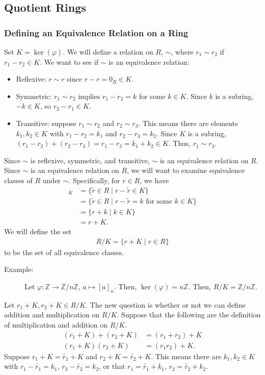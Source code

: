 \documentclass[10pt]{extarticle}
\newcommand{\Z}{\mathbb{Z}}
\begin{document}
  \subsection{Quotient Rings}%
  \subsubsection{Defining an Equivalence Relation on a Ring}%
  Set $K = \ker(\varphi)$. We will define a relation on $R$, $\sim$, where $r_1 \sim r_2$ if $r_1-r_2\in K$. We want to see if $\sim$ is an equivalence relation:
  \begin{itemize}
    \item Reflexive: $r\sim r$ since $r-r=0_R \in K$.
    \item Symmetric: $r_1\sim r_2$ implies $r_1 - r_2 = k$ for some $k\in K$. Since $k$ is a subring, $-k\in K$, so $r_2 - r_1\in K$.
    \item Transitive: suppose $r_1 \sim r_2$ and $r_2\sim r_3$. This means there are elements $k_1,k_2\in K$ with $r_1-r_2 = k_1$ and $r_2-r_3 = k_2$. Since $K$ is a subring, $(r_1 - r_2) + (r_2 - r_3) = r_1 - r_3 = k_1 + k_2\in K$. Thus, $r_1 \sim r_3$.
  \end{itemize}
  Since $\sim$ is reflexive, symmetric, and transitive, $\sim$ is an equivalence relation on $R$.\\
  
  Since $\sim$ is an equivalence relation on $R$, we will want to examine equivalence classes of $R$ under $\sim$. Specifically, for $r\in R$, we have
  \begin{align*}
    [r]_K &= \{\tilde{r}\in R \mid r-\tilde{r}\in K\}\\
          &= \{\tilde{r}\in R \mid r - \tilde{r} = k\text{ for some }k\in K\}\\
          &= \{r + k\mid k\in K\}\\
          &= r+K.
  \end{align*}
  We will define the set
  \begin{align*}
    R/K = \{r + K\mid r\in R\}
  \end{align*}
  to be the set of all equivalence classes.
  \begin{description}
    \item[Example:] Let $\varphi: \Z\rightarrow \Z/n\Z$, $a\mapsto [a]_n$. Then, $\ker(\varphi) = n\Z$. Then, $R/K = \Z/n\Z$.
  \end{description}
  Let $r_1 + K,r_2+K\in R/K$. The new question is whether or not we can define addition and multiplication on $R/K$. Suppose that the following are the definition of multiplication and addition on $R/K$.
  \begin{align*}
    (r_1 + K) + (r_2 + K) &= (r_1 + r_2) + K\\
    (r_1 + K)(r_2 + K) &= (r_1r_2) + K.
  \end{align*}
  Suppose $r_1 + K = \tilde{r_1} + K$ and $r_2 + K = \tilde{r_2} + K$. This means there are $k_1,k_2\in K$ with $r_1 - \tilde{r_1} = k_1$, $r_2 - \tilde{r_2} = k_2$, or that $r_1 = \tilde{r_1} + k_1$, $r_2 = \tilde{r_2} + k_2$.\\
\end{document}
